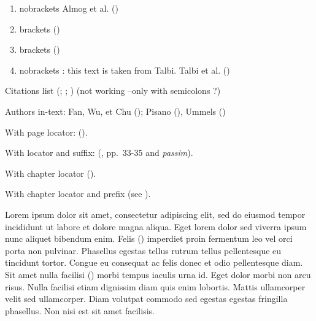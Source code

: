 \documentclass[
]{article}
\begin{document}
\begin{enumerate}
\def\labelenumi{\arabic{enumi}.}
\item
  nobrackets Almog et al.
  ()
\item
  brackets ()
\item
  brackets
  ()
\item
  nobrackets : this text is taken from Talbi. Talbi et al.
  ()
\end{enumerate}

Citations list
(; ; ) (not working --only with semicolons ?)

Authors in-text: Fan, Wu, et Chu
(); Pisano
(), Ummels
()

With page locator: ().

With locator and suffix:
(, pp.~33-35
and \emph{passim}).

With chapter locator ().

With chapter locator and prefix (see
).

Lorem ipsum dolor sit amet, consectetur adipiscing elit, sed do eiusmod
tempor incididunt ut labore et dolore magna aliqua. Eget lorem dolor sed
viverra ipsum nunc aliquet bibendum enim. Felis
() imperdiet proin fermentum leo vel orci porta non pulvinar.
Phasellus egestas tellus rutrum tellus pellentesque eu tincidunt tortor.
Congue eu consequat ac felis donec et odio pellentesque diam. Sit amet
nulla facilisi
() morbi tempus iaculis urna id. Eget dolor morbi non arcu risus.
Nulla facilisi etiam dignissim diam quis enim lobortis. Mattis
ullamcorper velit sed ullamcorper. Diam volutpat commodo sed egestas
egestas fringilla phasellus. Non nisi est sit amet facilisis.
\end{document}
